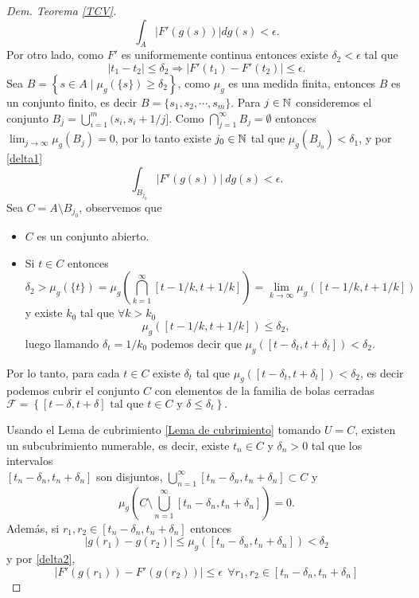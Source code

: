 \begin{proof}[Dem. Teorema \eqref{TCV}]
\begin{equation}
 \int_{A}|F'(g(s))|dg(s)< \epsilon. \label{delta1}
\end{equation}
Por otro lado, como $F'$ es uniformemente continua entonces existe $\delta_2<\epsilon$ tal que 
	\begin{equation}
		|t_1-t_2|\leq  \delta_2\Rightarrow |F'(t_1)-F'(t_2)|\leq \epsilon. \label{delta2}
	\end{equation}
	Sea $B=\left\lbrace s\in A \mid \mu_{g}(\{s\})\geq \delta_2\right\rbrace $, como $\mu_{g}$ es una medida finita, entonces $B$ es un conjunto finito, es decir $B=\{s_1,s_2,\cdots,s_m\}$. Para $j\in\mathbb{N}$ consideremos el conjunto $\displaystyle B_j=\bigcup_{i=1}^{m}(s_i, s_i+1/j]$. Como $\displaystyle \bigcap_{j=1}^{\infty}B_j=\emptyset$ entonces $\displaystyle \lim_{j\to\infty}\mu_{g}(B_j)=0$, por lo tanto existe $j_0\in \mathbb{N}$ tal que $\mu_{g}(B_{j_0})<\delta_1$, y por \eqref{delta1} $$\int_{B_{j_0}}|F'(g(s))|\: dg(s)< \epsilon. $$
	Sea $C=A\setminus{B_{j_0}}$, observemos que
	\begin{itemize}
 		\item $C$ es un conjunto abierto. 
		\item Si $t\in C$ entonces
	$$\delta_2>\mu_{g}(\{t\})=\mu_{g}\left( \bigcap_{k=1}^{\infty}[t-1/k,t+1/k] \right)=\lim\limits_{k\to\infty}\mu_{g}\left([t-1/k,t+1/k] \right) $$
y existe $k_0$ tal que $\forall k>k_0$
	$$\mu_{g}\left([t-1/k,t+1/k] \right)\leq \delta_2,$$
	luego llamando $\delta_t=1/k_0$ podemos decir que $\mu_{g}\left([t-\delta_t,t+\delta_t] \right)<\delta_2$.
		\end{itemize}  
	Por lo tanto, para cada $t\in C$ existe $\delta_t$ tal que $\mu_{g}\left([t-\delta_t,t+\delta_t] \right)<\delta_2$, es decir podemos cubrir el conjunto $C$ con elementos de la familia de bolas cerradas $\mathcal{F}=\left\lbrace [t-\delta,t+\delta] \text{ tal que } t\in C \text{ y }\delta\leq \delta_t\right\rbrace .$

	Usando el Lema de cubrimiento \ref{Lema de  cubrimiento} tomando $U=C$, existen un subcubrimiento numerable, es decir, existe $t_n\in C$ y $\delta_{n}>0$ tal que los intervalos\\ $[t_n-\delta_n, t_n+\delta_n]$ son disjuntos, $\displaystyle\bigcup_{n=1}^{\infty}[t_n-\delta_n, t_n+\delta_n]\subset C$ y \begin{equation}\label{eq:cubrimiento}
	    \displaystyle\mu_{g}\left( C\setminus\bigcup_{n=1}^{\infty}[t_n-\delta_n, t_n+\delta_n]\right) =0.\end{equation}
Además, si $r_1,r_2\in[t_n-\delta_n, t_n+\delta_n]$ entonces 
	\begin{equation}
	|g(r_1)-g(r_2)|\leq \mu_{g}\left( [t_n-\delta_n, t_n+\delta_n]\right)<\delta_2
	\label{eq:cota de g(C)}
\end{equation}
	y por \eqref{delta2},
	\begin{equation}\label{eq:1}
	|F'(g(r_1))-F'(g(r_2))|\leq \epsilon\ \ \forall r_1,r_2\in [t_n-\delta_n, t_n+\delta_n]
\end{equation}
	

\end{proof}
